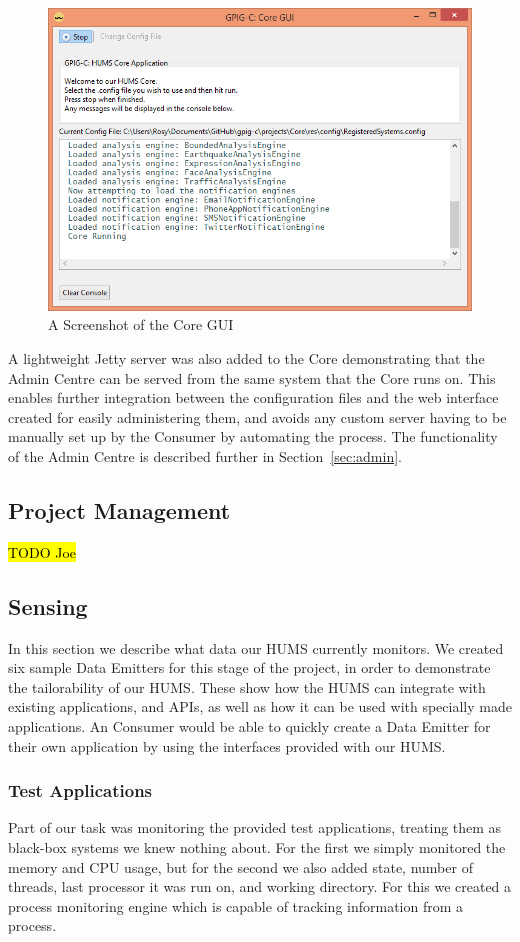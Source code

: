 \documentclass[10pt,a4paper]{article}
\begin{document}
\begin{figure}[tb]
\centering
\includegraphics[width = \textwidth]{images/coreGUI.png}
\caption{A Screenshot of the Core GUI}
\label{fig:coreGUI}
\end{figure}
A lightweight Jetty server was also added to the Core demonstrating that the Admin Centre can be served from the same system that the Core runs on. This enables further integration between the configuration files and the web interface created for easily administering them, and avoids any custom server having to be manually set up by the Consumer by automating the process. The functionality of the Admin Centre is described further in Section~\ref{sec:admin}. 

\subsection{Project Management}
\hl{TODO Joe}

\subsection{Sensing}
\label{sec:monitor}
In this section we describe what data our HUMS currently monitors. We created six sample Data Emitters for this stage of the project, in order to demonstrate the tailorability of our HUMS. These show how the HUMS can integrate with existing applications, and APIs, as well as how it can be used with specially made applications. An Consumer would be able to quickly create a Data Emitter for their own application by using the interfaces provided with our HUMS.

\subsubsection{Test Applications} \label{subsec:tapp}
Part of our task was monitoring the provided test applications, treating them as black-box systems we knew nothing about. For the first we simply monitored the memory and CPU usage, but for the second we also added state, number of threads, last processor it was run on, and working directory. For this we created a process monitoring engine which is capable of tracking information from a process.
\end{document}
